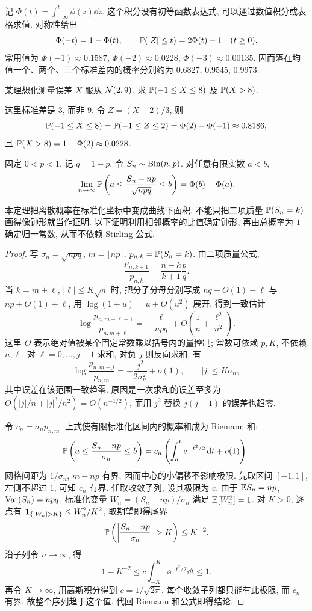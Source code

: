 记 $\Phi(t)=\int_{-\infty}^t\phi(z)\dd z$. 这个积分没有初等函数表达式, 可以通过数值积分或表格求值. 对称性给出
\[
 \Phi(-t)=1-\Phi(t),\qquad
 \mathbb P(|Z|\le t)=2\Phi(t)-1\quad(t\ge0).
\]
常用值为 $\Phi(-1)\approx0.1587$, $\Phi(-2)\approx0.0228$, $\Phi(-3)\approx0.00135$. 因而落在均值一个、两个、三个标准差内的概率分别约为 $0.6827$, $0.9545$, $0.9973$.

\begin{example}
某理想化测量误差 $X$ 服从 $\mathcal N(2,9)$. 求 $\mathbb P(-1\le X\le8)$ 及 $\mathbb P(X>8)$.
\end{example}
\begin{solution}
这里标准差是 $3$, 而非 $9$. 令 $Z=(X-2)/3$, 则
\[
 \mathbb P(-1\le X\le8)=\mathbb P(-1\le Z\le2)
 =\Phi(2)-\Phi(-1)\approx0.8186,
\]
且 $\mathbb P(X>8)=1-\Phi(2)\approx0.0228$.
\end{solution}


\begin{theorem}
固定 $0<p<1$, 记 $q=1-p$, 令 $S_n\sim\operatorname{Bin}(n,p)$. 对任意有限实数 $a<b$,
\[
 \lim_{n\to\infty}\mathbb P\left(a\le\frac{S_n-np}{\sqrt{npq}}\le b\right)
 =\Phi(b)-\Phi(a).
\]
\end{theorem}

本定理把离散概率在标准化坐标中变成曲线下面积. 不能只把二项质量 $\mathbb P(S_n=k)$ 画得像钟形就当作证明. 以下证明利用相邻概率的比值确定钟形, 再由总概率为 $1$ 确定归一常数, 从而不依赖 Stirling 公式.

\begin{proof}
写 $\sigma_n=\sqrt{npq}$, $m=\lfloor np\rfloor$, $p_{n,k}=\mathbb P(S_n=k)$. 由二项质量公式,
\[
 \frac{p_{n,k+1}}{p_{n,k}}=\frac{n-k}{k+1}\frac pq.
\]
当 $k=m+\ell$, $|\ell|\le K\sqrt n$ 时, 把分子分母分别写成 $nq+O(1)-\ell$ 与 $np+O(1)+\ell$, 用
$\log(1+u)=u+O(u^2)$ 展开, 得到一致估计
\[
 \log\frac{p_{n,m+\ell+1}}{p_{n,m+\ell}}
 =-\frac{\ell}{npq}+O\left(\frac1n+\frac{\ell^2}{n^2}\right).
\]
这里 $O$ 表示绝对值被某个固定常数乘以括号内的量控制; 常数可依赖 $p,K$, 不依赖 $n,\ell$. 对 $\ell=0,\ldots,j-1$ 求和, 对负 $j$ 则反向求和, 有
\[
 \log\frac{p_{n,m+j}}{p_{n,m}}
 =-\frac{j^2}{2\sigma_n^2}+o(1),\qquad |j|\le K\sigma_n,
\]
其中误差在该范围一致趋零. 原因是一次求和的误差至多为
$O(|j|/n+|j|^3/n^2)=O(n^{-1/2})$, 而用 $j^2$ 替换 $j(j-1)$ 的误差也趋零.

令 $c_n=\sigma_n p_{n,m}$. 上式使有限标准化区间内的概率和成为 Riemann 和:
\[
 \mathbb P\left(a\le\frac{S_n-np}{\sigma_n}\le b\right)
 =c_n\left(\int_a^b\mathrm e^{-t^2/2}\,\mathrm d t+o(1)\right).
\]
网格间距为 $1/\sigma_n$, $m-np$ 有界, 因而中心的小偏移不影响极限. 先取区间 $[-1,1]$, 左侧不超过 $1$, 可知 $c_n$ 有界. 任取收敛子列, 设其极限为 $c$. 由于 $\mathbb E S_n=np$, $\operatorname{Var}(S_n)=npq$, 标准化变量 $W_n=(S_n-np)/\sigma_n$ 满足 $\mathbb E[W_n^2]=1$. 对 $K>0$, 逐点有 $\ind_{\{|W_n|>K\}}\le W_n^2/K^2$, 取期望即得尾界
\[
 \Prob\left(\left|\frac{S_n-np}{\sigma_n}\right|>K\right)\le K^{-2}.
\]
沿子列令 $n\to\infty$, 得
\[
 1-K^{-2}\le c\int_{-K}^K\ee^{-t^2/2}\dd t\le1.
\]
再令 $K\to\infty$, 用高斯积分得到 $c=1/\sqrt{2\pi}$. 每个收敛子列都只能有此极限, 而 $c_n$ 有界, 故整个序列趋于这个值. 代回 Riemann 和公式即得结论.
\end{proof}

